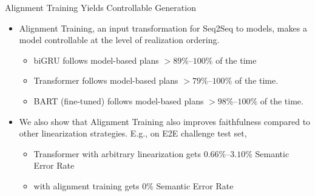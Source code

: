 \begin{frame}{Alignment Training Yields Controllable Generation}

\begin{itemize}
    \item Alignment Training, an input transformation for Seq2Seq to models,
    makes a model controllable at the level of 
    realization ordering.

      \begin{itemize}
        \item<2-> biGRU       follows model-based plans $>89\%$--$100\%$ of the time
        \item<3->  Transformer follows model-based plans $>79\%$--$100\%$ of the time.
        \item<4-> BART (fine-tuned) follows model-based plans $>98\%$--$100\%$ of the time.
       
\end{itemize}

\vspace{10pt}

    \item<5-> We also show that Alignment Training also improves faithfulness
    compared to other linearization strategies. E.g., on E2E challenge test set,
        \begin{itemize}
            \item Transformer with arbitrary linearization gets $0.66\%$--$3.10\%$ Semantic Error Rate
            \item with alignment training gets $0\%$ Semantic Error Rate
        \end{itemize}
      \end{itemize}

\end{frame}

%
%

\EtoEPermOA

